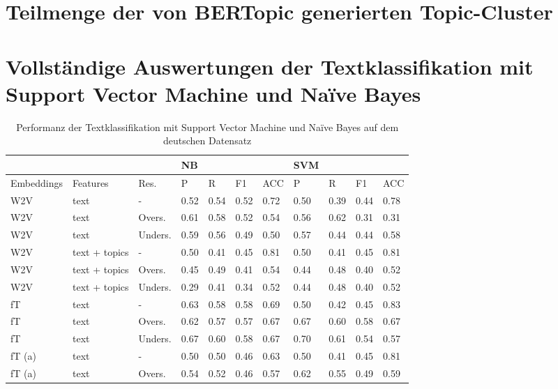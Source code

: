 \documentclass[ngerman]{ttlab-qualify}
\begin{document}
\chapter{Teilmenge der von BERTopic generierten Topic-Cluster}

\chapter{Vollständige Auswertungen der Textklassifikation mit Support Vector Machine und Naïve Bayes}
\newpage
\begin{table}[!ht]
    \centering
    \caption{Performanz der Textklassifikation mit Support Vector Machine und Naïve Bayes auf dem deutschen Datensatz}
    \begin{tabular}{|l|l|l|l|l|l|l|l|l|l|l|}
    \hline
        \textbf{} & \textbf{} & \textbf{} & \textbf{NB} & \textbf{} & \textbf{} & \textbf{} & \textbf{SVM} & \textbf{} & \textbf{} & \textbf{} \\ \hline
        Embeddings & Features & Res. & P & R & F1 & ACC & P & R & F1 & ACC \\ \hline
        W2V  & text  &   - & 0.52 & 0.54 & 0.52 & 0.72 & 0.50 & 0.39 & 0.44 & 0.78 \\ \hline
        W2V  & text  & Overs. & 0.61 & 0.58 & 0.52 & 0.54 & 0.56 & 0.62 & 0.31 & 0.31 \\ \hline
        W2V  & text  & Unders. & 0.59 & 0.56 & 0.49 & 0.50 & 0.57 & 0.44 & 0.44 & 0.58 \\ \hline
        W2V  & text + topics &   - & 0.50 & 0.41 & 0.45 & 0.81 & 0.50 & 0.41 & 0.45 & 0.81 \\ \hline
        W2V  & text + topics & Overs. & 0.45 & 0.49 & 0.41 & 0.54 & 0.44 & 0.48 & 0.40 & 0.52 \\ \hline
        W2V   & text + topics & Unders. & 0.29 & 0.41 & 0.34 & 0.52 & 0.44 & 0.48 & 0.40 & 0.52 \\ \hline
        fT  & text  &   - & 0.63 & 0.58 & 0.58 & 0.69 & 0.50 & 0.42 & 0.45 & 0.83 \\ \hline
        fT  & text  & Overs. & 0.62 & 0.57 & 0.57 & 0.67 & 0.67 & 0.60 & 0.58 & 0.67 \\ \hline
        fT  & text  & Unders. & 0.67 & 0.60 & 0.58 & 0.67 & 0.70 & 0.61 & 0.54 & 0.57 \\ \hline
        fT (a) & text  &   - & 0.50 & 0.50 & 0.46 & 0.63 & 0.50 & 0.41 & 0.45 & 0.81 \\ \hline
        fT  (a) & text  & Overs. & 0.54 & 0.52 & 0.46 & 0.57 & 0.62 & 0.55 & 0.49 & 0.59 \\ \hline

\end{tabular}
\end{table}
\end{document}
